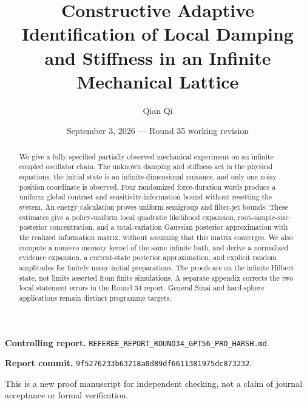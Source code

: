 \documentclass[11pt,reqno]{amsart}
\title[Adaptive identification of an infinite mechanical lattice]{Constructive Adaptive Identification of Local Damping and Stiffness in an Infinite Mechanical Lattice}
\author{Qian Qi}
\date{September 3, 2026 --- Round 35 working revision}
\begin{document}
\begin{abstract}
We give a fully specified partially observed mechanical experiment on an infinite coupled oscillator chain. The unknown damping and stiffness act in the physical equations, the initial state is an infinite-dimensional nuisance, and only one noisy position coordinate is observed. Four randomized force-duration words produce a uniform global contrast and sensitivity-information bound without resetting the system. An energy calculation proves uniform semigroup and filter-jet bounds. These estimates give a policy-uniform local quadratic likelihood expansion, root-sample-size posterior concentration, and a total-variation Gaussian posterior approximation with the realized information matrix, without assuming that this matrix converges. We also compute a nonzero memory kernel of the same infinite bath, and derive a normalized evidence expansion, a current-state posterior approximation, and explicit random amplitudes for finitely many initial preparations. The proofs are on the infinite Hilbert state, not limits asserted from finite simulations. A separate appendix corrects the two local statement errors in the Round 34 report. General Sinai and hard-sphere applications remain distinct programme targets.
\end{abstract}
\maketitle
\noindent\textbf{Controlling report.} \texttt{REFEREE\_REPORT\_ROUND34\_GPT56\_PRO\_HARSH.md}.\par
\noindent\textbf{Report commit.} \texttt{9f5276233b63218a0d89df6611381975dc873232}.\par
\noindent This is a new proof manuscript for independent checking, not a claim of journal acceptance or formal verification.
\tableofcontents

\appendix


\end{document}
